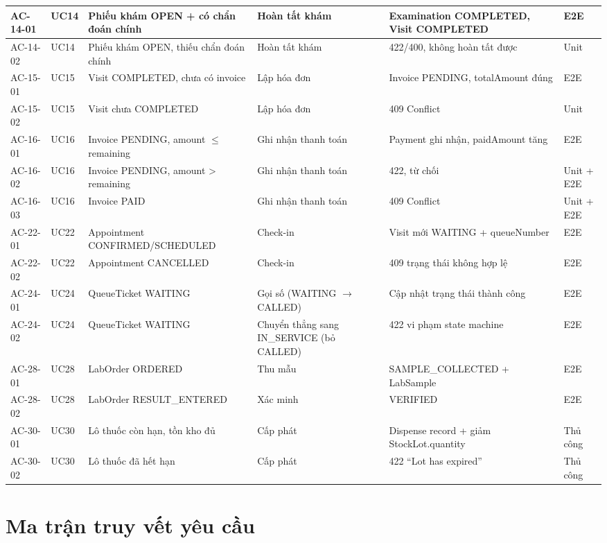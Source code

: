 \begin{longtable}{|p{1.5cm}|p{1.2cm}|p{3.3cm}|p{3.3cm}|p{2.5cm}|p{1.7cm}|}
\hline
AC-14-01 & UC14 & Phiếu khám OPEN + có chẩn đoán chính & Hoàn tất khám & Examination COMPLETED, Visit COMPLETED & E2E \\
\hline
AC-14-02 & UC14 & Phiếu khám OPEN, thiếu chẩn đoán chính & Hoàn tất khám & 422/400, không hoàn tất được & Unit \\
\hline
AC-15-01 & UC15 & Visit COMPLETED, chưa có invoice & Lập hóa đơn & Invoice PENDING, totalAmount đúng & E2E \\
\hline
AC-15-02 & UC15 & Visit chưa COMPLETED & Lập hóa đơn & 409 Conflict & Unit \\
\hline
AC-16-01 & UC16 & Invoice PENDING, amount $\leq$ remaining & Ghi nhận thanh toán & Payment ghi nhận, paidAmount tăng & E2E \\
\hline
AC-16-02 & UC16 & Invoice PENDING, amount > remaining & Ghi nhận thanh toán & 422, từ chối & Unit + E2E \\
\hline
AC-16-03 & UC16 & Invoice PAID & Ghi nhận thanh toán & 409 Conflict & Unit + E2E \\
\hline
AC-22-01 & UC22 & Appointment CONFIRMED/SCHEDULED & Check-in & Visit mới WAITING + queueNumber & E2E \\
\hline
AC-22-02 & UC22 & Appointment CANCELLED & Check-in & 409 trạng thái không hợp lệ & E2E \\
\hline
AC-24-01 & UC24 & QueueTicket WAITING & Gọi số (WAITING $\rightarrow$ CALLED) & Cập nhật trạng thái thành công & E2E \\
\hline
AC-24-02 & UC24 & QueueTicket WAITING & Chuyển thẳng sang IN\_SERVICE (bỏ CALLED) & 422 vi phạm state machine & E2E \\
\hline
AC-28-01 & UC28 & LabOrder ORDERED & Thu mẫu & SAMPLE\_COLLECTED + LabSample & E2E \\
\hline
AC-28-02 & UC28 & LabOrder RESULT\_ENTERED & Xác minh & VERIFIED & E2E \\
\hline
AC-30-01 & UC30 & Lô thuốc còn hạn, tồn kho đủ & Cấp phát & Dispense record + giảm StockLot.quantity & Thủ công \\
\hline
AC-30-02 & UC30 & Lô thuốc đã hết hạn & Cấp phát & 422 ``Lot has expired'' & Thủ công \\
\hline
\end{longtable}

\section{Ma trận truy vết yêu cầu}
\label{sec:srs-traceability}

